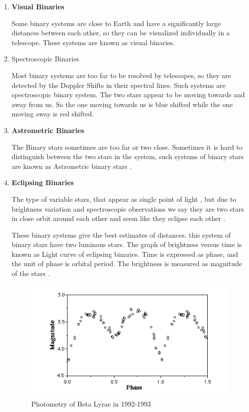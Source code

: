 \begin{enumerate}

\item\textbf{Visual Binaries}

Some binary systems are close to Earth and have a significantly large distances between each    other, so they can be visualized individually in a telescope. These systems are known as visual binaries. \cite{sys_1}

\item {Spectroscopic Binaries }

Most binary systems are too far to be resolved by telescopes, so they are detected by the Doppler Shifts in their spectral lines. Such systems are spectroscopic binary system. The two stars appear to be moving towards and away from us. So the one moving towards us is blue shifted while the one moving away is red shifted.


\item \textbf{Astrometric Binaries}

The Binary stars sometimes are too far or two close. Sometimes it is hard to distinguish between the two stars in the system, such systems of binary stars are known as Astrometric binary stars \cite{astrometric_binaries}.


\item \textbf{Eclipsing Binaries}

The type of variable stars, that appear as single point of light , but due to brightness variation and spectroscopic observations we say they are two stars in close orbit around each other and seem like they eclipse each other \cite{eclipsing_binaries}.


These binary systems give the best estimates of distances. this system of binary stars have two luminous stars. The graph of brightness versus time is known as Light curve of eclipsing binaries. Time is expressed as phase, and the unit of phase is orbital period. The brightness is measured as magnitude of the stars \cite{eclipsing_binaries}.

\begin{figure} [h]
\centering
\includegraphics[scale=0.5]{LC}
\caption{Photometry of Beta Lyrae in 1992-1993}
\end{figure}

\end{enumerate}

